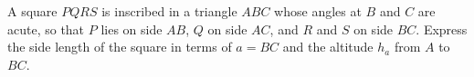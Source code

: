 A square $PQRS$ is inscribed in a triangle $ABC$ whose angles at $B$ and $C$ are acute, so that $P$ lies on side $AB$, $Q$ on side $AC$, and $R$ and $S$ on side $BC$. Express the side length of the square in terms of $a=BC$ and the altitude $h_a$ from $A$ to $BC$.
